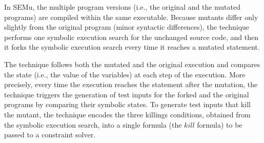 

In SEMu, the multiple program versions (i.e., the original and the mutated programs) are compiled within the same executable. 
Because mutants differ only slightly from the original program (minor syntactic differences), the technique performs one symbolic execution search for the unchanged source code, and then it forks the symbolic execution search every time it reaches a mutated statement.

The technique follows both the mutated and the original execution and compares the state (i.e., the value of the variables) at each step of the execution.
More precisely,  every time the execution reaches the statement after the mutation, the technique triggers the generation of test inputs for the forked and the original programs by comparing their symbolic states. To generate test inputs that kill the mutant, the technique encodes the three killings conditions, obtained from the symbolic execution search, into a single formula (the $kill$ formula) to be passed to a constraint solver.

